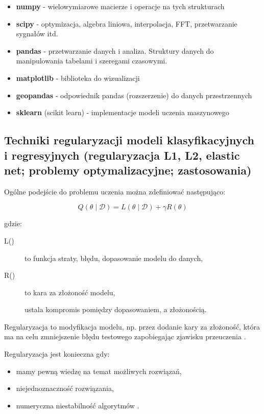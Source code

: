 \documentclass[wi]{zut}
\begin{document}
\begin{itemize}
    \item \textbf{numpy} - wielowymiarowe macierze i operacje na tych strukturach
    \item \textbf{scipy} - optymizacja, algebra liniowa, interpolacja, FFT, przetwarzanie sygnałów itd.
    \item \textbf{pandas} - przetwarzanie danych i analiza. Struktury danych do manipulowania tabelami i szeregami czasowymi.
    \item \textbf{matplotlib} - biblioteka do wizualizacji
    \item \textbf{geopandas} - odpowiednik pandas (rozszerzenie) do danych przestrzennych
    \item \textbf{sklearn} (scikit learn) - implementacje modeli uczenia maszynowego
\end{itemize}

\subsection{Techniki regularyzacji modeli klasyfikacyjnych i regresyjnych (regularyzacja L1, L2, elastic net; problemy optymalizacyjne; zastosowania)}

Ogólne podejście do problemu uczenia można zdefiniować następująco:

\begin{equation}
    Q(\theta \mid \mathscr{D})=L(\theta \mid \mathscr{D})+\gamma R(\theta)
\end{equation}

gdzie:

\begin{description}
\item[L(\theta \mid {})] to funkcja straty, błędu, dopasowanie modelu do danych,
\item[R(\theta)] to kara za złożoność modelu,
\item[\gamma] ustala kompromis pomiędzy dopasowaniem, a złożonością.
\end{description}

Regularyzacja to modyfikacja modelu, np. przez dodanie kary za złożoność, która ma na celu zmniejszenie błędu testowego zapobiegając zjawisku przeuczenia \cite{wiki:Regularization}.

Regularyzacja jest konieczna gdy:

\begin{itemize}
    \item mamy pewną wiedzę na temat możliwych rozwiązań,
    \item niejednoznaczność rozwiązania,
    \item numeryczna niestabilność algorytmów \cite{Korzen2020_12}.
\end{itemize}
\question
\end{document}
